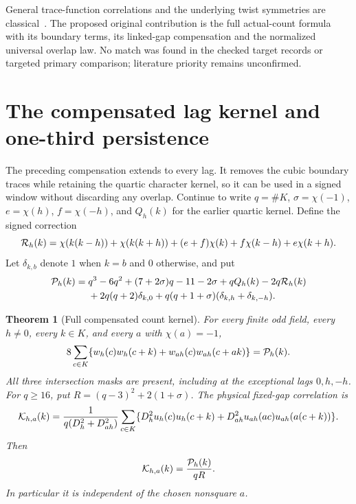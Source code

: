 \documentclass[11pt]{article}
\newtheorem{theorem}{Theorem}[section]
\begin{document}
General trace-function correlations and the underlying twist
symmetries are classical~\cite{FouvryKowalskiMichelProducts,KatzTraceRatios}.
The proposed original contribution is the full actual-count formula
with its boundary terms, its linked-gap compensation and the normalized
universal overlap law. No match was found in the checked target records
or targeted primary comparison; literature priority remains unconfirmed.

\section{The compensated lag kernel and one-third persistence}
\label{sec:compensated-persistence}

The preceding compensation extends to every lag. It removes the cubic
boundary traces while retaining the quartic character kernel, so it
can be used in a signed window without discarding any overlap.
Continue to write \(q=\#K\), \(\sigma=\chi(-1)\), \(e=\chi(h)\),
\(f=\chi(-h)\), and \(Q_h(k)\) for the earlier quartic kernel.
Define the signed correction
\[
 {\cal R}_h(k)=
 \chi(k(k-h))+\chi(k(k+h))+(e+f)\chi(k)
       +f\chi(k-h)+e\chi(k+h).
\]
Let \(\delta_{k,b}\) denote \(1\) when \(k=b\) and \(0\) otherwise, and put
\begin{align*}
 {\cal P}_h(k)={}&q^3-6q^2+(7+2\sigma)q-11-2\sigma+qQ_h(k)
                    -2q{\cal R}_h(k)\\
 &+2q(q+2)\delta_{k,0}
    +q(q+1+\sigma)(\delta_{k,h}+\delta_{k,-h}).
\end{align*}

\begin{theorem}[Full compensated count kernel]
For every finite odd field, every \(h\ne0\), every \(k\in K\), and
every \(a\) with \(\chi(a)=-1\),
\[
 8\sum_{c\in K}\{w_h(c)w_h(c+k)+w_{ah}(c)w_{ah}(c+ak)\}
       ={\cal P}_h(k).
 \label{thm:full-compensated-kernel}
\]
All three intersection masks are present, including at the exceptional
lags \(0,h,-h\).
For \(q\ge16\), put \(R=(q-3)^2+2(1+\sigma)\). The physical fixed-gap
correlation is
\[
 {\cal K}_{h,a}(k)=
 \frac{1}{q(D_h^2+D_{ah}^2)}
 \sum_{c\in K}\{D_h^2u_h(c)u_h(c+k)
       +D_{ah}^2u_{ah}(ac)u_{ah}(a(c+k))\}.
\]
Then
\begin{equation}
 {\cal K}_{h,a}(k)=\frac{{\cal P}_h(k)}{qR}.
 \label{eq:full-compensated-model}
\end{equation}
In particular it is independent of the chosen nonsquare \(a\).
\end{theorem}
\end{document}

